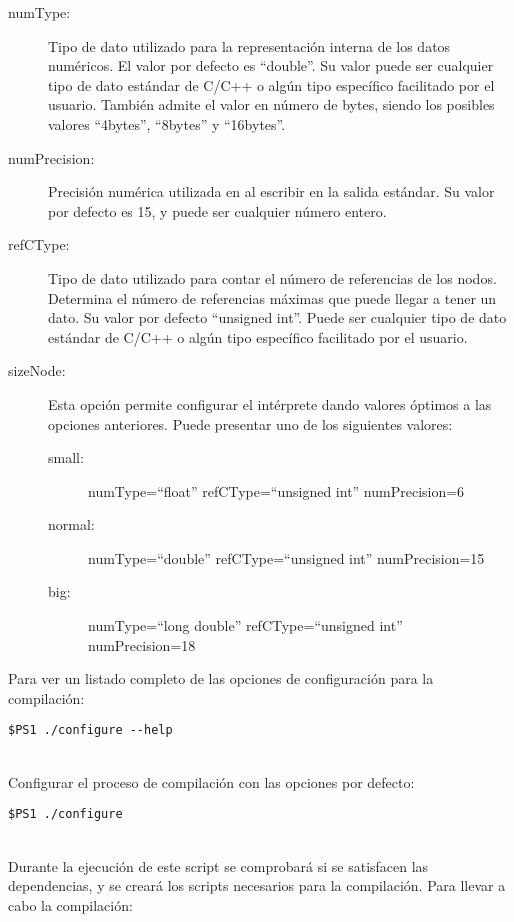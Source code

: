 \begin{description}
\item [numType:] Tipo de dato utilizado para la representación interna de los datos numéricos. El valor por defecto es ``double''.
Su valor puede ser cualquier tipo de dato estándar de C/C++ o algún tipo específico facilitado por el usuario. También admite el
valor en número de bytes, siendo los posibles valores ``4bytes'', ``8bytes'' y ``16bytes''.
\item [numPrecision:] Precisión numérica utilizada en al escribir en la salida estándar. Su valor por defecto es 15, y puede ser cualquier número entero.
\item [refCType:] Tipo de dato utilizado para contar el número de referencias de los nodos. Determina el número de referencias máximas que puede llegar a tener un 
dato. Su valor por defecto ``unsigned int''. Puede ser cualquier tipo de dato estándar de C/C++ o  algún tipo específico facilitado por el usuario.
\item [sizeNode:] Esta opción permite configurar el intérprete dando valores óptimos a las opciones anteriores. Puede presentar uno de los siguientes valores:
\begin{description}
\item [small:] numType=``float'' refCType=``unsigned int'' numPrecision=6
\item [normal:] numType=``double'' refCType=``unsigned int'' numPrecision=15
\item [big:] numType=``long double'' refCType=``unsigned int'' numPrecision=18
\end{description}
\end{description}

Para ver un listado completo de las opciones de configuración para la compilación:\\
\begin{lstlisting}
$PS1 ./configure --help 
\end{lstlisting}
\hfill\\

Configurar el proceso de compilación con las opciones por defecto:\\
\begin{lstlisting}
$PS1 ./configure 
\end{lstlisting}
\hfill\\

Durante la ejecución de este script se comprobará si se satisfacen las dependencias, y se creará los scripts necesarios para la compilación.
Para llevar a cabo la compilación:\\


